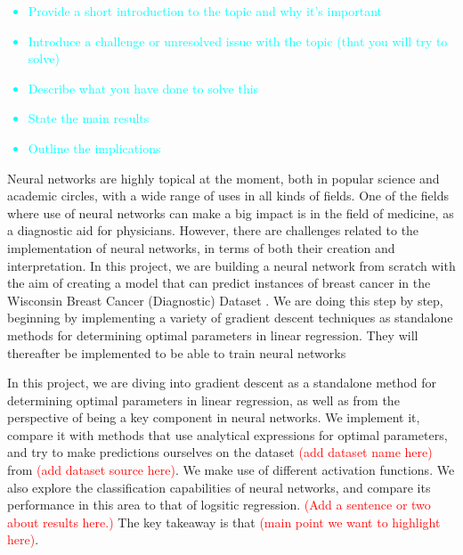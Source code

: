 \begin{adjustwidth}{2cm}{2cm} %
        \textcolor{cyan}{
        \begin{itemize}
            \item Provide a short introduction to the topic and why it's important
            \item Introduce a challenge or unresolved issue with the topic (that you will try to solve)
            \item Describe what you have done to solve this
            \item State the main results
            \item Outline the implications
        \end{itemize}}

        Neural networks are highly topical at the moment, both in popular science and academic circles, with a wide range of uses in all kinds of fields. One of the fields where use of neural networks can make a big impact is in the field of medicine, as a diagnostic aid for physicians. However, there are challenges related to the implementation of neural networks, in terms of both their creation and interpretation. In this project, we are building a neural network from scratch with the aim of creating a model that can predict instances of breast cancer in the Wisconsin Breast Cancer (Diagnostic) Dataset \cite{sklearnBreastCancerData}. We are doing this step by step, beginning by implementing a variety of gradient descent techniques as standalone methods for determining optimal parameters in linear regression. They will thereafter be implemented to be able to train neural networks
        
        In this project, we are diving into gradient descent as a standalone method for determining optimal parameters in linear regression, as well as from the perspective of being a key component in neural networks. We implement it, compare it with methods that use analytical expressions for optimal parameters, and try to make predictions ourselves on the dataset \textcolor{red}{(add dataset name here)} from \textcolor{red}{(add dataset source here)}. We make use of different activation functions. We also explore the classification capabilities of neural networks, and compare its performance in this area to that of logsitic regression. \textcolor{red}{(Add a sentence or two about results here.)} The key takeaway is that \textcolor{red}{(main point we want to highlight here)}.
      \end{adjustwidth}


